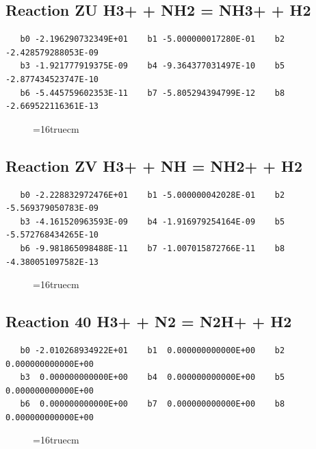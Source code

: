 \documentclass[12pt,dvipdfm]{article}
\begin{document}
\subsection{
Reaction ZU H3+ + NH2 = NH3+ + H2}
\begin{small}\begin{verbatim}
   b0 -2.196290732349E+01    b1 -5.000000017280E-01    b2 -2.428579288053E-09
   b3 -1.921777919375E-09    b4 -9.364377031497E-10    b5 -2.877434523747E-10
   b6 -5.445759602353E-11    b7 -5.805294394799E-12    b8 -2.669522116361E-13
   \end{verbatim}\end{small}
\begin{figure}[h!]
\label{n2rates}
\epsfxsize=16truecm
\end{figure}
\newpage

\subsection{
Reaction ZV H3+ + NH = NH2+ + H2}
\begin{small}\begin{verbatim}
   b0 -2.228832972476E+01    b1 -5.000000042028E-01    b2 -5.569379050783E-09
   b3 -4.161520963593E-09    b4 -1.916979254164E-09    b5 -5.572768434265E-10
   b6 -9.981865098488E-11    b7 -1.007015872766E-11    b8 -4.380051097582E-13
   \end{verbatim}\end{small}
\begin{figure}[h!]
\label{n2rates}
\epsfxsize=16truecm
\end{figure}
\newpage

\subsection{
Reaction 40 H3+ + N2 = N2H+ + H2}
\begin{small}\begin{verbatim}
   b0 -2.010268934922E+01    b1  0.000000000000E+00    b2  0.000000000000E+00
   b3  0.000000000000E+00    b4  0.000000000000E+00    b5  0.000000000000E+00
   b6  0.000000000000E+00    b7  0.000000000000E+00    b8  0.000000000000E+00
   \end{verbatim}\end{small}
\begin{figure}[h!]
\label{n2rates}
\epsfxsize=16truecm
\end{figure}
\newpage
\end{document}
